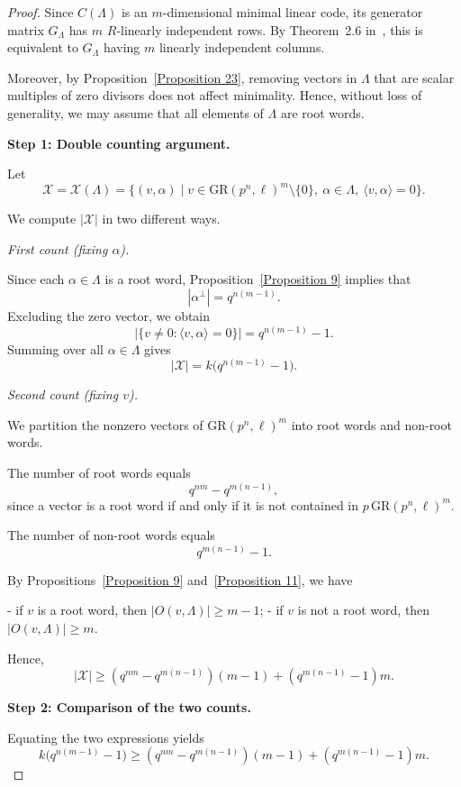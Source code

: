 \documentclass[10pt]{article}
\theoremstyle{definition}
\begin{document}
\begin{proof}
Since \( C(\Lambda) \) is an \( m \)-dimensional minimal linear code, its generator matrix \( G_\Lambda \) has \( m \) $R$-linearly independent rows.
By Theorem~2.6 in~\cite{NortonSalagean}, this is equivalent to \( G_\Lambda \) having \( m \) linearly independent columns.

Moreover, by Proposition~\ref{Proposition 23}, removing vectors in \( \Lambda \) that are scalar multiples of zero divisors does not affect minimality. Hence, without loss of generality, we may assume that all elements of \( \Lambda \) are root words.

\medskip
\noindent
\textbf{Step 1: Double counting argument.}

Let
\[
\mathcal{X} = \mathcal{X}(\Lambda)
=
\{(v,\alpha) \mid
v \in \mathrm{GR}(p^{n},\ell)^{m} \setminus \{0\},
\ \alpha \in \Lambda,
\ \langle v,\alpha \rangle = 0
\}.
\]

We compute \( |\mathcal{X}| \) in two different ways.

\medskip
\noindent
\emph{First count (fixing $\alpha$).}

Since each $\alpha \in \Lambda$ is a root word, Proposition~\ref{Proposition 9} implies that
\[
|\alpha^{\perp}| = q^{n(m-1)}.
\]
Excluding the zero vector, we obtain
\[
|\{v \neq 0 : \langle v,\alpha\rangle = 0\}|
=
q^{n(m-1)} - 1.
\]
Summing over all $\alpha \in \Lambda$ gives
\[
|\mathcal{X}|
=
k\big(q^{n(m-1)} - 1\big).
\]

\medskip
\noindent
\emph{Second count (fixing $v$).}

We partition the nonzero vectors of $\mathrm{GR}(p^{n},\ell)^{m}$ into root words and non-root words.

The number of root words equals
\[
q^{nm} - q^{m(n-1)},
\]
since a vector is a root word if and only if it is not contained in
\( p\,\mathrm{GR}(p^{n},\ell)^{m} \).

The number of non-root words equals
\[
q^{m(n-1)} - 1.
\]

By Propositions~\ref{Proposition 9} and~\ref{Proposition 11}, we have

- if $v$ is a root word, then \( |O(v,\Lambda)| \ge m-1 \);
- if $v$ is not a root word, then \( |O(v,\Lambda)| \ge m \).

Hence,
\[
|\mathcal{X}|
\ge
(q^{nm} - q^{m(n-1)})(m-1)
+
(q^{m(n-1)} - 1)m.
\]

\medskip
\noindent
\textbf{Step 2: Comparison of the two counts.}

Equating the two expressions yields
\[
k\big(q^{n(m-1)} - 1\big)
\ge
(q^{nm} - q^{m(n-1)})(m-1)
+
(q^{m(n-1)} - 1)m.
\]


\end{proof}
\end{document}
